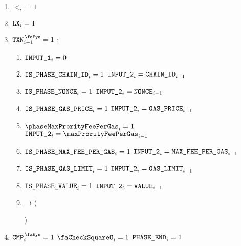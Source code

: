 \begin{center}
\end{center}

\begin{enumerate}
    \item $\lt_{i} =1$
    \item $\texttt{LX}_{i} =1$
    \item \If $\isTxn_{i-1} =1$ \Then:
    \begin{enumerate}
        \item                                             $\texttt{INPUT\_1}_{i} = 0$
        \item \If $\texttt{IS\_PHASE\_CHAIN\_ID}            _{i}=1$ \Then $\texttt{INPUT\_2}_{i} = \texttt{CHAIN\_ID}            _{i-1}$
        \item \If $\texttt{IS\_PHASE\_NONCE}              _{i}=1$ \Then $\texttt{INPUT\_2}_{i} = \texttt{NONCE}              _{i-1}$
        \item \If $\texttt{IS\_PHASE\_GAS\_PRICE}           _{i}=1$ \Then $\texttt{INPUT\_2}_{i} = \texttt{GAS\_PRICE}           _{i-1}$
        \item \If $\phaseMaxProrityFeePerGas_{i}=1$ \Then $\inputColumn{2}_{i} = \maxProrityFeePerGas_{i-1}$
        \item \If $\texttt{IS\_PHASE\_MAX\_FEE\_PER\_GAS}       _{i}=1$ \Then $\texttt{INPUT\_2}_{i} = \texttt{MAX\_FEE\_PER\_GAS}       _{i-1}$
        \item \If $\texttt{IS\_PHASE\_GAS\_LIMIT}           _{i}=1$ \Then $\texttt{INPUT\_2}_{i} = \texttt{GAS\_LIMIT}           _{i-1}$
        \item \If $\texttt{IS\_PHASE\_VALUE}              _{i}=1$ \Then $\texttt{INPUT\_2}_{i} = \texttt{VALUE}               _{i-1}$
        \item
            \rlpInteger_{i}
            \left(
            \right)
            \]
    \end{enumerate}
    \item \If $\isCmp_{i} =1$ \et $\done_{i}=1$ \Then $\texttt{PHASE\_END}_{i}=1$
\end{enumerate}